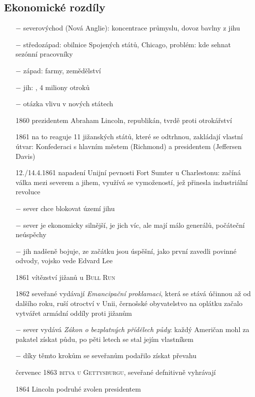 \documentclass{article}
\begin{document}
\subsection*{Ekonomické rozdíly}
\begin{itemize}
    \vspace{-0.5em}
    \setlength\itemsep{0.15em}
    \item[$-$] severovýchod (Nová Anglie): koncentrace průmyslu, dovoz bavlny z jihu
    \item[$-$] středozápad: obilnice Spojených států, Chicago, problém: kde sehnat sezónní pracovníky
    \item[$-$] západ: farmy, zemědělství
    \item[$-$] jih: , 4 miliony otroků
    \item[$-$] otázka vlivu v nových státech
    \item[1860] prezidentem Abraham Lincoln, republikán, tvrdě proti otrokářství
    \item[1861] na to reaguje 11 jižanských států, které se odtrhnou, zakládají vlastní útvar: Konfederaci s hlavním městem (Richmond) a presidentem (Jeffersen Davis)
    \item[12./14.4.1861] napadení Unijní pevnosti Fort Sumter u Charlestonu: začíná válka mezi severem a jihem, využívá se vymožeností, jež přinesla industriální revoluce
    \item[$-$] sever chce blokovat území jihu
    \item[$-$] sever je ekonomicky silnější, je jich víc, ale mají málo generálů, počáteční neúspěchy
    \item[$-$] jih nadšeně bojuje, ze začátku jsou úspěšní, jako první zavedli povinné odvody, vojsko vede Edvard Lee
    \item[1861] vítězství jižanů u \textsc{Bull Run}
    \item[1862] seveřané vydávají \textit{Emancipační proklamaci}, která se stává účinnou až od dalšího roku, ruší otroctví v Unii, černošské obyvatelstvo na oplátku začalo vytvářet armádní oddíly proti jižanům
    \item[$-$] sever vydává \textit{Zákon o bezplatných přídělech půdy}: každý Američan mohl za pakatel získat půdu, po pěti letech se stal jejím vlastníkem
    \item[$-$] díky těmto krokům se seveřanům podařilo získat převahu
    \item[červenec 1863] \textsc{bitva u Gettysburgu}, seveřané defnitivně vyhrávají
    \item[1864] Lincoln podruhé zvolen presidentem

\end{itemize}
\end{document}
